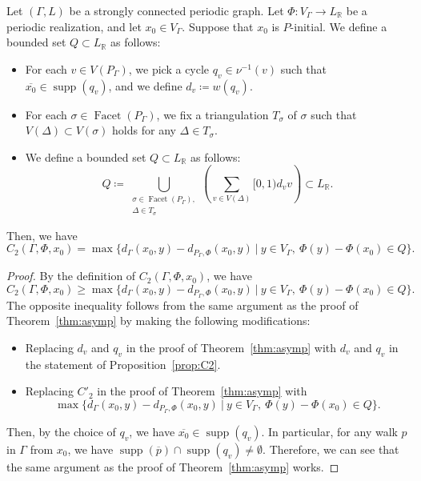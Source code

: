 \documentclass[ALCO,published]{cedram}
\theoremstyle{remark}
\begin{document}
\begin{prop}\label{prop:C2}
Let $(\Gamma, L)$ be a strongly connected periodic graph. 
Let $\Phi\colon V_{\Gamma} \to L_{\mathbb{R}}$ be a periodic realization, and let $x_0 \in V_{\Gamma}$. 
Suppose that $x_0$ is $P$-initial. 
We define a bounded set $Q \subset L_{\mathbb{R}}$ as follows:
\begin{itemize}
\item 
For each $v \in V(P_{\Gamma})$, we pick a cycle $q_v \in \nu^{-1}(v)$ such that 
$\overline{x_0} \in \operatorname{supp}(q_v)$, and we define $d_v \coloneqq  w(q_v)$. 

\item 
For each $\sigma \in \operatorname{Facet}(P_{\Gamma})$, 
we fix a triangulation $T_{\sigma}$ of $\sigma$ such that $V(\Delta) \subset V(\sigma)$ holds for any $\Delta \in T_{\sigma}$. 

\item 
We define a bounded set $Q \subset L_{\mathbb{R}}$ as follows:
\[
Q \coloneqq  
\bigcup _{\substack{\sigma \in \operatorname{Facet}(P_{\Gamma}),\\ 
\Delta \in T_{\sigma}}}
\left( \sum _{v \in V(\Delta)}  [0,1) d_v v \right)
\subset L_{\mathbb{R}}. 
\]
\end{itemize}
Then, we have
\[
C_2(\Gamma, \Phi, x_0) = 
\max \bigl \{ d_{\Gamma}(x_0, y) - d_{P_{\Gamma}, \Phi} (x_0, y) \ \big | \ 
y \in V_{\Gamma},\ \Phi(y) - \Phi(x_0) \in Q \bigr \}.
\]
\end{prop}

\begin{proof}
By the definition of $C_2(\Gamma, \Phi, x_0)$, we have 
\[
C_2(\Gamma, \Phi, x_0) \ge 
\max \bigl \{ d_{\Gamma}(x_0, y) - d_{P_{\Gamma}, \Phi} (x_0, y) \ \big | \ 
y \in V_{\Gamma},\ \Phi(y) - \Phi(x_0) \in Q \bigr \}.
\]
The opposite inequality follows from the same argument as the proof of Theorem~\ref{thm:asymp} 
by making the following modifications: 
\begin{itemize}
\item
Replacing $d_v$ and $q_v$ in the proof of Theorem~\ref{thm:asymp} with $d_v$ and $q_v$ in the statement of Proposition~\ref{prop:C2}.

\item
Replacing $C' _2$ in the proof of Theorem~\ref{thm:asymp} with
\[
\max \bigl \{ d_{\Gamma}(x_0, y) - d_{P_{\Gamma}, \Phi} (x_0, y) \ \big | \ 
y \in V_{\Gamma},\ \Phi(y) - \Phi(x_0) \in Q \bigr \}. 
\]
\end{itemize}
Then, by the choice of $q_v$, we have $\overline{x_0} \in \operatorname{supp}(q_v)$. 
In particular, for any walk $p$ in $\Gamma$ from $x_0$, we have 
$\operatorname{supp} (\overline{p}) \cap \operatorname{supp}(q_v) \not = \emptyset$. 
Therefore, we can see that the same argument as the proof of Theorem~\ref{thm:asymp} works. 
\end{proof}
\end{document}
